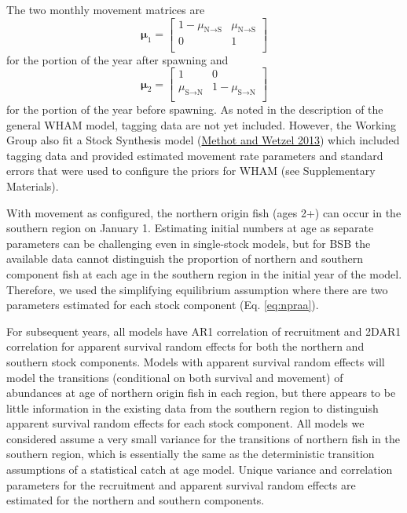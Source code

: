 \documentclass[
]{article}
\begin{document}
The two monthly movement matrices are
\begin{equation*}
\boldsymbol{\mu}_{1} = 
  \begin{bmatrix}
     1-\mu_{\text{N}\rightarrow \text{S}} & \mu_{\text{N}\rightarrow \text{S}} \\
     0 & 1 \\
  \end{bmatrix}
\end{equation*}
for the portion of the year after spawning and
\begin{equation*}
\boldsymbol{\mu}_{2} = 
  \begin{bmatrix}
     1 &  0 \\
     \mu_{\text{S}\rightarrow \text{N}} & 1-\mu_{\text{S}\rightarrow \text{N}} \\
  \end{bmatrix}
\end{equation*}
for the portion of the year before spawning. As noted in the description of the general WHAM model, tagging data are not yet included. However, the Working Group also fit a Stock Synthesis model (\protect\hyperlink{ref-methotwetzel13}{Methot and Wetzel 2013}) which included tagging data and provided estimated movement rate parameters and standard errors that were used to configure the priors for WHAM (see Supplementary Materials).

With movement as configured, the northern origin fish (ages 2+) can occur in the southern region on January 1. Estimating initial numbers at age as separate parameters can be challenging even in single-stock models, but for BSB the available data cannot distinguish the proportion of northern and southern component fish at each age in the southern region in the initial year of the model. Therefore, we used the simplifying equilibrium assumption where there are two parameters estimated for each stock component (Eq. \ref{eq:npraa}).

For subsequent years, all models have AR1 correlation of recruitment and 2DAR1 correlation for apparent survival random effects for both the northern and southern stock components. Models with apparent survival random effects will model the transitions (conditional on both survival and movement) of abundances at age of northern origin fish in each region, but there appears to be little information in the existing data from the southern region to distinguish apparent survival random effects for each stock component. All models we considered assume a very small variance for the transitions of northern fish in the southern region, which is essentially the same as the deterministic transition assumptions of a statistical catch at age model. Unique variance and correlation parameters for the recruitment and apparent survival random effects are estimated for the northern and southern components.
\end{document}
